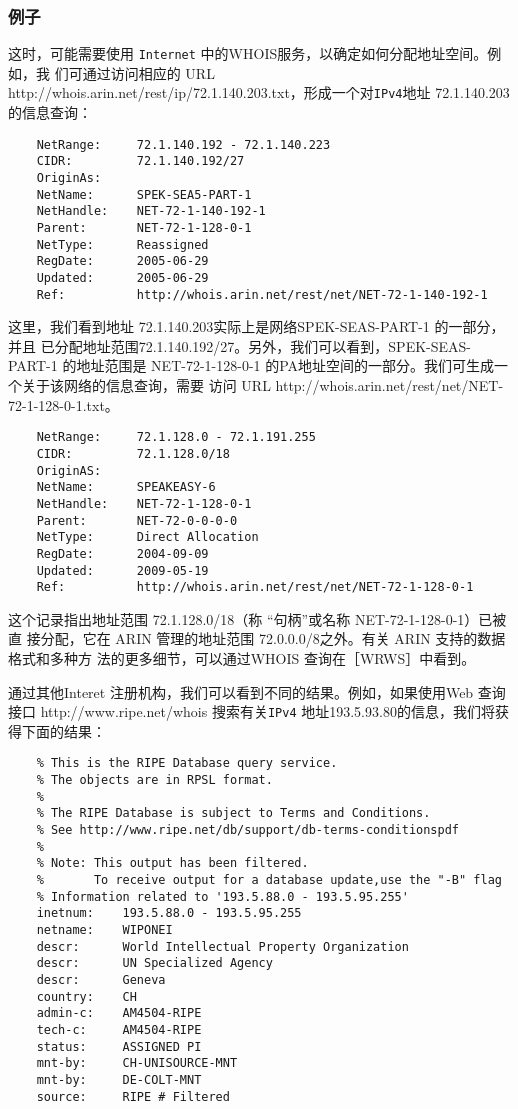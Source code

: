 \subsubsection{例子}
这时，可能需要使用 \verb|Internet| 中的WHOIS服务，以确定如何分配地址空间。例如，我
们可通过访问相应的 URL http://whois.arin.net/rest/ip/72.1.140.203.txt，形成一个对\verb|IPv4|地址
72.1.140.203的信息查询：
\begin{verbatim}
    NetRange:     72.1.140.192 - 72.1.140.223
    CIDR:         72.1.140.192/27
    OriginAs:
    NetName:      SPEK-SEA5-PART-1
    NetHandle:    NET-72-1-140-192-1
    Parent:       NET-72-1-128-0-1
    NetType:      Reassigned
    RegDate:      2005-06-29
    Updated:      2005-06-29
    Ref:          http://whois.arin.net/rest/net/NET-72-1-140-192-1
\end{verbatim}

这里，我们看到地址 72.1.140.203实际上是网络SPEK-SEAS-PART-1 的一部分，并且
已分配地址范围72.1.140.192/27。另外，我们可以看到，SPEK-SEAS-PART-1 的地址范围是
NET-72-1-128-0-1 的PA地址空间的一部分。我们可生成一个关于该网络的信息查询，需要
访问 URL http://whois.arin.net/rest/net/NET-72-1-128-0-1.txt。

\begin{verbatim}
    NetRange:     72.1.128.0 - 72.1.191.255
    CIDR:         72.1.128.0/18
    OriginAS:
    NetName:      SPEAKEASY-6
    NetHandle:    NET-72-1-128-0-1
    Parent:       NET-72-0-0-0-0
    NetType:      Direct Allocation
    RegDate:      2004-09-09
    Updated:      2009-05-19
    Ref:          http://whois.arin.net/rest/net/NET-72-1-128-0-1
\end{verbatim}

这个记录指出地址范围 72.1.128.0/18（称 “句柄”或名称 NET-72-1-128-0-1）已被直
接分配，它在 ARIN 管理的地址范围 72.0.0.0/8之外。有关 ARIN 支持的数据格式和多种方
法的更多细节，可以通过WHOIS 查询在［WRWS］中看到。

通过其他Interet 注册机构，我们可以看到不同的结果。例如，如果使用Web 查询接口
http://www.ripe.net/whois 搜索有关\verb|IPv4| 地址193.5.93.80的信息，我们将获得下面的结果：

\begin{verbatim}
    % This is the RIPE Database query service.
    % The objects are in RPSL format.
    %
    % The RIPE Database is subject to Terms and Conditions.
    % See http://www.ripe.net/db/support/db-terms-conditionspdf
    %
    % Note: This output has been filtered.
    %       To receive output for a database update,use the "-B" flag
    % Information related to '193.5.88.0 - 193.5.95.255'
    inetnum:    193.5.88.0 - 193.5.95.255
    netname:    WIPONEI
    descr:      World Intellectual Property Organization
    descr:      UN Specialized Agency
    descr:      Geneva
    country:    CH
    admin-c:    AM4504-RIPE
    tech-c:     AM4504-RIPE
    status:     ASSIGNED PI
    mnt-by:     CH-UNISOURCE-MNT
    mnt-by:     DE-COLT-MNT
    source:     RIPE # Filtered
\end{verbatim}

